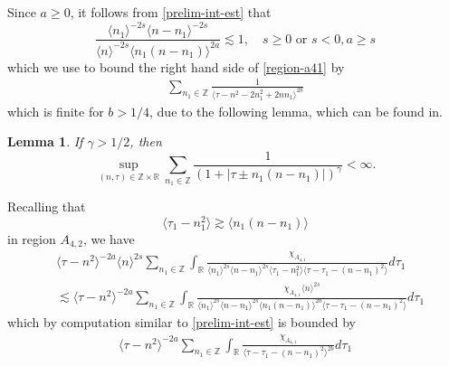 \documentclass[12pt,reqno]{amsart}
\numberwithin{equation}{section}  %
\numberwithin{figure}{section}
\newcommand{\rr}{\mathbb{R}}
\newcommand{\zz}{\mathbb{Z}}
\theoremstyle{plain}
\newtheorem{lemma}{Lemma}
\theoremstyle{definition}
\theoremstyle{remark}
\begin{document}
%
Since $a \ge 0$, it follows from \eqref{prelim-int-est} that 
%
\begin{equation*}
\frac{\langle n_1 \rangle ^{-2s} \langle n - n_{1} \rangle ^{-2s}}{\langle
n \rangle ^{-2s} \langle n_{1}(n - n_{1}) \rangle
^{2a}} \lesssim 1, \quad s \ge 0 \text{ or } s < 0, a \ge s
\end{equation*}
%
%
which we use to bound the right hand side of \eqref{region-a41} by
%
%
\begin{equation*}
\begin{split}
\sum_{n_{1} \in
\zz} 
\frac{1}{\langle \tau - n^{2} - 2n_{1}^{2} + 2nn_{1}  \rangle ^{2b}}
\end{split}
\end{equation*}
%
%
%
which is finite for $b > 1/4$, due to the following lemma, which can be found in. 
\begin{lemma}
  \label{lem:sum-estimate}
If $\gamma>1/2$, then
\begin{equation}\label{CI2}
\sup_{(n,\tau)\in \zz \times \rr}\sum_{n_1\in \zz}\frac{1}{(1+|\tau\pm n_1(n-n_1)|)^{\gamma}}<\infty. 
\end{equation}
\end{lemma}
%
Recalling that 
$$ \langle \tau_{1} - n_{1}^{2} \rangle
\gtrsim \langle n_{1}(n - n_{1}) \rangle$$
%
in region $A_{4,2}$, we have
%
%
\begin{equation*}
\begin{split}
& \langle \tau - n^{2}  \rangle ^{-2a} \langle n
    \rangle ^{2s}
    \sum_{n_{1} \in \zz} \int_{\rr} \frac{\chi_{A_{4,1}}}{ \langle n_{1} \rangle ^{2s} \langle n-n_{1} \rangle ^{2s} 
\langle \tau_{1} - n_{1}^{2}  \rangle \langle  \tau - \tau_{1} - (n -
n_{1})^{2}  \rangle}
d \tau_1 
\\
& \lesssim \langle \tau - n^{2}  \rangle ^{-2a}     \sum_{n_{1} \in \zz} \int_{\rr} \frac{\chi_{A_{4,1}} \langle n
    \rangle ^{2s}
}{ \langle n_{1} \rangle ^{2s} \langle n-n_{1} \rangle ^{2s} 
\langle n_{1}(n - n_{1}) \rangle ^{2b} \langle  \tau - \tau_{1} - (n -
n_{1})^{2}  \rangle}
d \tau_1 
\end{split}
\end{equation*}
%
%
which by computation similar to \eqref{prelim-int-est}
is bounded by
%
%
\begin{equation}
  \label{prelim-int-est-2}
\begin{split}
\langle \tau - n^{2}  \rangle ^{-2a} \sum_{n_{1} \in \zz} \int_{\rr} \frac{\chi_{A_{4,1}} }{ \langle  \tau - \tau_{1} - (n -
n_{1})^{2}  \rangle^{2b}}
d \tau_1 
\end{split}
\end{equation}
\end{document}
